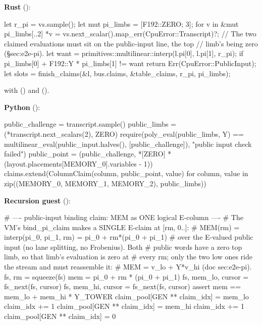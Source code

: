 \textbf{Rust} ():

\begin{srccode}
    let r_pi = vs.sample();
    let mut pi_limbs = [F192::ZERO; 3];
    for v in &mut pi_limbs[..2] {
        *v = vs.next_scalar().map_err(CpuError::Transcript)?;
    }
    // The two claimed evaluations must sit on the public-input line, the top
    // limb's being zero (§sec:e2e-pi).
    let want = primitives::multilinear::interp(l.pi[0], l.pi[1], r_pi);
    if pi_limbs[0] + F192::Y * pi_limbs[1] != want {
        return Err(CpuError::PublicInput);
    }
    let slots = finish_claims(&l, bus.claims, &table_claims, r_pi, pi_limbs);
\end{srccode}

with  ()
and  ().

\textbf{Python} ():

\begin{srccode}
    public_challenge = transcript.sample()
    public_limbs = (*transcript.next_scalars(2), ZERO)
    require(poly_eval(public_limbs, Y) == multilinear_eval(public_input.halves(), [public_challenge]), "public input check failed")
    public_point = (public_challenge, *[ZERO] * (layout.placements[MEMORY_0].variables - 1))
    claims.extend(ColumnClaim(column, public_point, value) for column, value in zip((MEMORY_0, MEMORY_1, MEMORY_2), public_limbs))
\end{srccode}

\textbf{Recursion guest} ():

\begin{srccode}
    # ---- public-input binding claim: MEM as ONE logical E-column ----
    # The VM's bind_pi_claim makes a SINGLE E-claim at [rm, 0..]:
    #   MEM(rm) = interp(pi_0, pi_1, rm) = pi_0 + rm*(pi_0 + pi_1)
    # over the E-valued public input (no lane splitting, no Frobenius). Both
    # public words have a zero top limb, so that limb's evaluation is zero at
    # every rm; only the two low ones ride the stream and must reassemble it:
    # MEM = v_lo + Y*v_hi (doc sec:e2e-pi).
    fs, rm = squeeze(fs)
    mem = pi_0 + rm * (pi_0 + pi_1)
    fs, mem_lo, cursor = fs_next(fs, cursor)
    fs, mem_hi, cursor = fs_next(fs, cursor)
    assert mem == mem_lo + mem_hi * Y_TOWER
    claim_pool[GEN ** claim_idx] = mem_lo
    claim_idx += 1
    claim_pool[GEN ** claim_idx] = mem_hi
    claim_idx += 1
    claim_pool[GEN ** claim_idx] = 0
\end{srccode}

